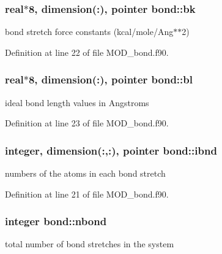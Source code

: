 \hypertarget{classbond_a62af7114dd5e4d888588a472841a3610}{
\subsubsection[{bk}]{\setlength{\rightskip}{0pt plus 5cm}real$\ast$8, dimension(\-:), pointer bond\-::bk}}\label{classbond_a62af7114dd5e4d888588a472841a3610}


bond stretch force constants (kcal/mole/\-Ang$\ast$$\ast$2) 



Definition at line 22 of file M\-O\-D\-\_\-bond.\-f90.

\hypertarget{classbond_ad7fdd84c462fc62d6965f86fe3e1b654}{
\subsubsection[{bl}]{\setlength{\rightskip}{0pt plus 5cm}real$\ast$8, dimension(\-:), pointer bond\-::bl}}\label{classbond_ad7fdd84c462fc62d6965f86fe3e1b654}


ideal bond length values in Angstroms 



Definition at line 23 of file M\-O\-D\-\_\-bond.\-f90.

\hypertarget{classbond_ad101842428382801adf4b1a978682072}{
\subsubsection[{ibnd}]{\setlength{\rightskip}{0pt plus 5cm}integer, dimension(\-:,\-:), pointer bond\-::ibnd}}\label{classbond_ad101842428382801adf4b1a978682072}


numbers of the atoms in each bond stretch 



Definition at line 21 of file M\-O\-D\-\_\-bond.\-f90.

\hypertarget{classbond_ab84bb10c64483bbfcca2287873670251}{
\subsubsection[{nbond}]{\setlength{\rightskip}{0pt plus 5cm}integer bond\-::nbond}}\label{classbond_ab84bb10c64483bbfcca2287873670251}


total number of bond stretches in the system 




